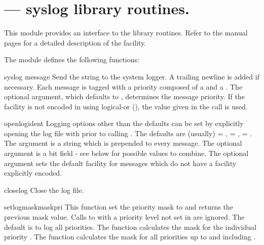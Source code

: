 \section{ ---
         \UNIX{} syslog library routines.}



This module provides an interface to the \UNIX{}  library
routines.  Refer to the \UNIX{} manual pages for a detailed description
of the  facility.

The module defines the following functions:


\begin{funcdesc}{syslog}{ message}
Send the string  to the system logger.  A trailing
newline is added if necessary.  Each message is tagged with a priority
composed of a  and a .  The optional
 argument, which defaults to ,
determines the message priority.  If the facility is not encoded in
 using logical-or (), the
value given in the  call is used.
\end{funcdesc}

\begin{funcdesc}{openlog}{ident}
Logging options other than the defaults can be set by explicitly
opening the log file with  prior to calling
.  The defaults are (usually)  =
,  = ,  =
.  The  argument is a string which is
prepended to every message.  The optional  argument is a
bit field - see below for possible values to combine.  The optional
 argument sets the default facility for messages which
do not have a facility explicitly encoded.
\end{funcdesc}

\begin{funcdesc}{closelog}{}
Close the log file.
\end{funcdesc}

\begin{funcdesc}{setlogmask}{maskpri}
This function set the priority mask to  and returns the
previous mask value.  Calls to  with a priority
level not set in  are ignored.  The default is to log all
priorities.  The function  calculates the
mask for the individual priority .  The function
 calculates the mask for all priorities up
to and including .
\end{funcdesc}

